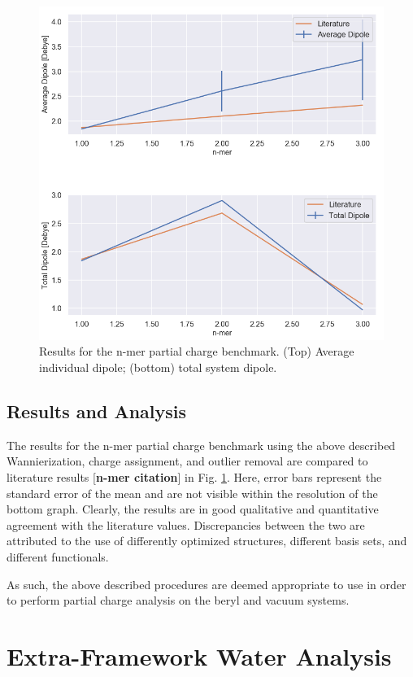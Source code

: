         \begin{figure}
            \centering
            \includegraphics[width=0.9\linewidth]{Figures/System/pc_benchmark_results.png}
            \caption{Results for the n-mer partial charge benchmark. (Top) Average individual dipole; (bottom) total system dipole.}
            \label{fig:pc_bench_results}
        \end{figure}
        
        \subsection{Results and Analysis} The results for the n-mer partial charge benchmark using the above described Wannierization, charge assignment, and outlier removal are compared to literature results [\textbf{n-mer citation}] in Fig. \ref{fig:pc_bench_results}. Here, error bars represent the standard error of the mean and are not visible within the resolution of the bottom graph. Clearly, the results are in good qualitative and quantitative agreement with the literature values. Discrepancies between the two are attributed to the use of differently optimized structures, different basis sets, and different functionals. 
        
        As such, the above described procedures are deemed appropriate to use in order to perform partial charge analysis on the beryl and vacuum systems.
        
    \section{Extra-Framework Water Analysis}
    
